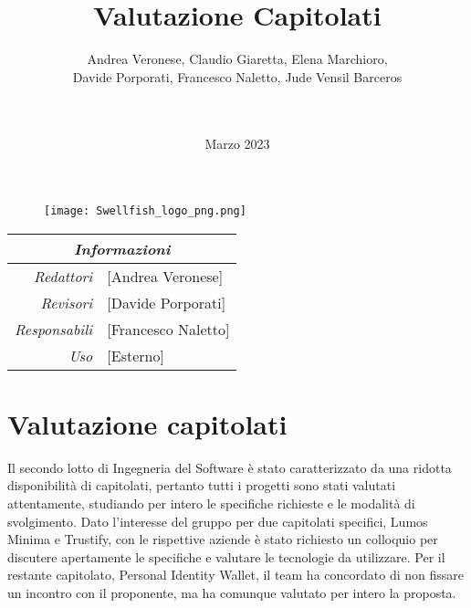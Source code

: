 \documentclass[12pt]{article}
\title{Valutazione Capitolati}
\begin{document}
\begin{figure}
\centering
\texttt{[image: Swellfish\_logo\_png.png]}
\end{figure}
\author{Andrea Veronese, Claudio Giaretta, Elena Marchioro,\\
Davide Porporati, Francesco Naletto, Jude Vensil Barceros \\ \\
 \href{swellfish14@gmail.com}{} \\
} 
\date{Marzo 2023}

\maketitle

\begin{center}
    \begin{tabular}{r | l}
		\multicolumn{2}{c}{\textit{Informazioni}}\\
		\hline
		
			\textit{Redattori} &
			[Andrea Veronese]\makecell{}\\
		
			\textit{Revisori} &
			[Davide Porporati]\makecell{}\\
			\textit{Responsabili} &
			[Francesco Naletto]\makecell{}\\
		      \textit{Uso} & 
                [Esterno]\makecell{}\\
\end{tabular}
\end{center}


\tableofcontents
\printindex 
\section{Valutazione capitolati}
Il secondo lotto di Ingegneria del Software è stato caratterizzato da una ridotta disponibilità di capitolati, pertanto tutti i progetti sono stati valutati attentamente, studiando per intero le specifiche richieste e le modalità di svolgimento.
Dato l'interesse del gruppo per due capitolati specifici, Lumos Minima e Trustify, con le rispettive aziende è stato richiesto un colloquio per discutere apertamente le specifiche e valutare le tecnologie da utilizzare.
Per il restante capitolato, Personal Identity Wallet, il team ha concordato di non fissare un incontro con il proponente, ma ha comunque valutato per intero la proposta.
\end{document}
